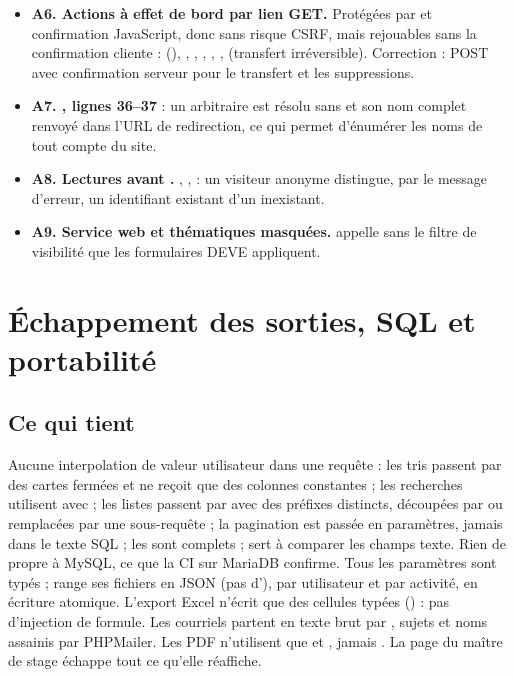 \documentclass[11pt,a4paper]{article}
\newcommand{\grav}[1]{\textbf{\textcolor{#1}{\textbullet}}}
\newcommand{\mineure}{\grav{gray}}
\begin{document}
\begin{itemize}
    convention entière (date de naissance, adresse, téléphone de l'étudiant).
  \item[\mineure] \textbf{A6. Actions à effet de bord par lien GET.} Protégées par 
    et confirmation JavaScript, donc sans risque CSRF, mais rejouables sans la confirmation
    cliente :  (), ,
    , , ,
    ,  (transfert irréversible).
    Correction :  POST avec confirmation serveur pour le transfert et les
    suppressions.
  \item[\mineure] \textbf{A7. , lignes 36--37} : un 
    arbitraire est résolu sans  et son nom complet renvoyé dans l'URL de
    redirection, ce qui permet d'énumérer les noms de tout compte du site.
  \item[\mineure] \textbf{A8. Lectures avant .}
    , ,
     : un visiteur anonyme distingue, par le message d'erreur, un
    identifiant existant d'un inexistant.
  \item[\mineure] \textbf{A9. Service web et thématiques masquées.}
     appelle  sans le filtre de visibilité
    que les formulaires DEVE appliquent.
\end{itemize}

\section{Échappement des sorties, SQL et portabilité}

\subsection{Ce qui tient}

Aucune interpolation de valeur utilisateur dans une requête : les tris passent par des cartes
fermées et  ne reçoit que des colonnes constantes ; les recherches
utilisent  avec  ; les listes  passent par
 avec des préfixes distincts, découpées par  ou
remplacées par une sous-requête ; la pagination est passée en paramètres, jamais dans le texte
SQL ; les  sont complets ;  sert à comparer les champs
texte. Rien de propre à MySQL, ce que la CI sur MariaDB confirme. Tous les paramètres sont typés ;
 range ses fichiers en JSON (pas d'), par utilisateur et
par activité, en écriture atomique. L'export Excel n'écrit que des cellules typées
() : pas d'injection de formule. Les courriels partent en texte brut par
, sujets et noms assainis par PHPMailer. Les PDF n'utilisent que
 et , jamais . La page du maître de stage échappe
tout ce qu'elle réaffiche.
\end{document}
